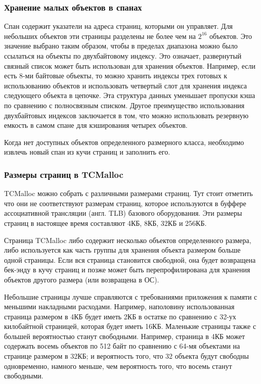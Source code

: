 \subsubsection{Хранение малых объектов в спанах}

Спан содержит указатели на адреса страниц, которыми он управляет. Для небольших объектов эти страницы разделены не более чем на $2^{16}$ объектов. Это значение выбрано таким образом, чтобы в пределах диапазона можно было ссылаться на объекты по двухбайтовому индексу. Это означает, развернутый связный список может быть использован для хранения объектов. Например, если есть 8-ми байтовые объекты, то можно хранить индексы трех готовых к использованию объектов и использовать четвертый слот для хранения индекса следующего объекта в цепочке. Эта структура данных уменьшает пропуски кэша по сравнению с полносвязным списком. Другое преимущество использования двухбайтовых индексов заключается в том, что можно использовать резервную емкость в самом спане для кэширования четырех объектов.

Когда нет доступных объектов определенного размерного класса, необходимо извлечь новый спан из кучи страниц и заполнить его.

\subsubsection{Размеры страниц в TCMalloc}

TCMalloc можно собрать с различными размерами страниц. Тут стоит отметить что они не соответствуют размерам страниц, которое используются в буффере ассоциативной трансляции (англ. TLB) базового оборудования. Эти размеры страниц в настоящее время составляют 4КБ, 8КБ, 32КБ и 256КБ.

Страница TCMalloc либо содержит несколько объектов определенного размера, либо используется как часть группы для хранения объекта размером больше одной страницы. Если вся страница становится свободной, она будет возвращена бек-энду в кучу страниц и позже может быть перепрофилирована для хранения объектов другого размера (или возвращена в ОС).

Небольшие страницы лучше справляются с требованиями приложения к памяти с меньшими накладными расходами. Например, наполовину использованная страница размером в 4КБ будет иметь 2КБ в остатке по сравнению с 32-ух килобайтной страницей, которая будет иметь 16КБ. Маленькие страницы также с большей вероятностью станут свободными. Например, страница в 4КБ может содержать восемь объектов по 512 байт по сравнению с 64-мя объектами на странице размером в 32КБ; и вероятность того, что 32 объекта будут свободны одновременно, намного меньше, чем вероятность того, что восемь станут свободными.

